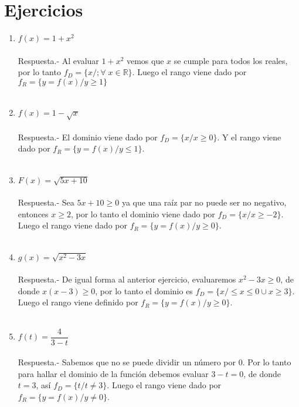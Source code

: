 \setcounter{section}{0}
\section{Ejercicios}

\begin{enumerate}

    \item $f(x)=1+x^2$ \\\\
	Respuesta.-\; Al evaluar $1+x^2$ vemos que $x$ se cumple para todos los reales, por lo tanto $f_D=\lbrace x /; \forall \; x \in \mathbb{R} \rbrace$. Luego el rango viene dado por $f_R=\lbrace y=f(x) / y \geq 1 \rbrace$\\\\

    \item $f(x)=1-\sqrt{x}$\\\\
       Respuesta.-\; El dominio viene dado por $f_D=\lbrace x / x \geq 0 \rbrace$. Y el rango viene dado por $f_R = \lbrace y = f(x) / y \leq 1 \rbrace$.\\\\

    \item $F(x)=\sqrt{5x + 10}$\\\\
	Respuesta.-\; Sea $5x + 10 \geq 0$ ya que una raíz par no puede ser no negativo, entonces $x \geq 2$, por lo tanto el dominio viene dado por $f_D=\lbrace x / x \geq -2 \rbrace$. Luego el rango viene dado por $f_R = \lbrace y=f(x) / y \geq 0 \rbrace$.\\\\

    \item $g(x)=\sqrt{x^2 - 3x}$\\\\
	Respuesta.-\; De igual forma al anterior ejercicio, evaluaremos $x^2 - 3x \geq 0$, de donde $x(x-3)\geq 0$, por lo tanto el dominio es $f_D=\lbrace x/\leq x \leq 0 \cup x \geq 3 \rbrace$. Luego el rango viene definido por $f_R=\lbrace y=f(x) / y \geq 0 \rbrace$.\\\\

    \item $f(t)=\dfrac{4}{3-t}$ \\\\
	Respuesta.-\; Sabemos que no se puede dividir un número por $0$. Por lo tanto para hallar el dominio de la función debemos evaluar $3-t=0$, de donde $t=3$, así $f_D=\lbrace t / t\neq 3\rbrace$. Luego el rango viene dado por $f_R=\lbrace y=f(x) / y\neq 0\rbrace$.\\\\


\end{enumerate}
